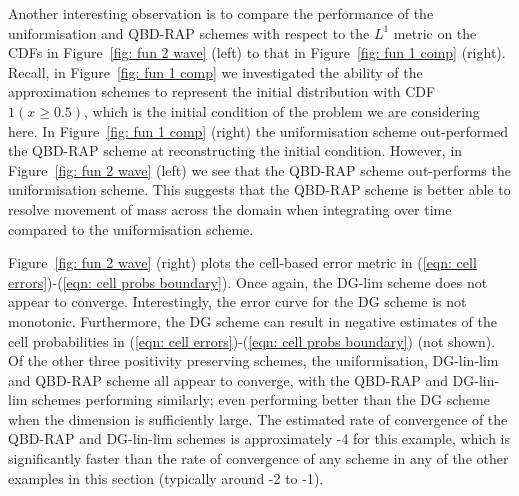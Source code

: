 \begin{example}
Another interesting observation is to compare the performance of the uniformisation and QBD-RAP schemes with respect to the \(L^1\) metric on the CDFs in Figure~\ref{fig: fun 2 wave} (left) to that in Figure~\ref{fig: fun 1 comp} (right). Recall, in Figure~\ref{fig: fun 1 comp} we investigated the ability of the approximation schemes to represent the initial distribution with CDF \(1(x\geq 0.5)\), which is the initial condition of the problem we are considering here. In Figure~\ref{fig: fun 1 comp} (right) the uniformisation scheme out-performed the QBD-RAP scheme at reconstructing the initial condition. However, in Figure~\ref{fig: fun 2 wave} (left) we see that the QBD-RAP scheme out-performs the uniformisation scheme. This suggests that the QBD-RAP scheme is better able to resolve movement of mass across the domain when integrating over time compared to the uniformisation scheme.  

Figure~\ref{fig: fun 2 wave} (right) plots the cell-based error metric in (\ref{eqn: cell errors})-(\ref{eqn: cell probs boundary}). Once again, the DG-lim scheme does not appear to converge. Interestingly, the error curve for the DG scheme is not monotonic. Furthermore, the DG scheme can result in negative estimates of the cell probabilities in (\ref{eqn: cell errors})-(\ref{eqn: cell probs boundary}) (not shown). Of the other three positivity preserving schemes, the uniformisation, DG-lin-lim and QBD-RAP scheme all appear to converge, with the QBD-RAP and DG-lin-lim schemes performing similarly; even performing better than the DG scheme when the dimension is sufficiently large. The estimated rate of convergence of the QBD-RAP and DG-lin-lim schemes is approximately -4 for this example, which is significantly faster than the rate of convergence of any scheme in any of the other examples in this section (typically around -2 to -1). 
\end{example}

